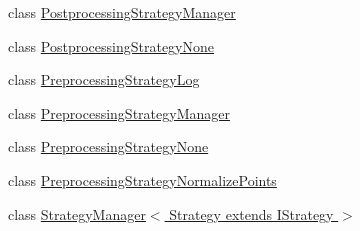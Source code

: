 \begin{DoxyCompactItemize}
class \hyperlink{classch_1_1zhaw_1_1ba10__bsha__1_1_1strategies_1_1PostprocessingStrategyManager}{PostprocessingStrategyManager}
\item 
class \hyperlink{classch_1_1zhaw_1_1ba10__bsha__1_1_1strategies_1_1PostprocessingStrategyNone}{PostprocessingStrategyNone}
\item 
class \hyperlink{classch_1_1zhaw_1_1ba10__bsha__1_1_1strategies_1_1PreprocessingStrategyLog}{PreprocessingStrategyLog}
\item 
class \hyperlink{classch_1_1zhaw_1_1ba10__bsha__1_1_1strategies_1_1PreprocessingStrategyManager}{PreprocessingStrategyManager}
\item 
class \hyperlink{classch_1_1zhaw_1_1ba10__bsha__1_1_1strategies_1_1PreprocessingStrategyNone}{PreprocessingStrategyNone}
\item 
class \hyperlink{classch_1_1zhaw_1_1ba10__bsha__1_1_1strategies_1_1PreprocessingStrategyNormalizePoints}{PreprocessingStrategyNormalizePoints}
\item 
class \hyperlink{classch_1_1zhaw_1_1ba10__bsha__1_1_1strategies_1_1StrategyManager_3_01Strategy_01extends_01IStrategy_01_4}{StrategyManager$<$ Strategy extends IStrategy $>$}
\end{DoxyCompactItemize}
